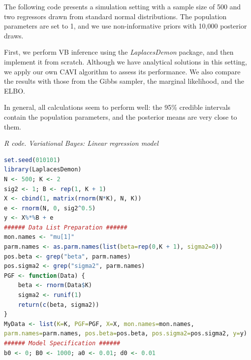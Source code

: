The following code presents a simulation setting with a sample size of 500 and two regressors drawn from standard normal distributions. The population parameters are set to 1, and we use non-informative priors with 10,000 posterior draws.

First, we perform VB inference using the \textit{LaplacesDemon} package, and then implement it from scratch. Although we have analytical solutions in this setting, we apply our own CAVI algorithm to assess its performance. We also compare the results with those from the Gibbs sampler, the marginal likelihood, and the ELBO.

In general, all calculations seem to perform well: the 95\% credible intervals contain the population parameters, and the posterior means are very close to them.
 
\begin{tcolorbox}[enhanced,width=4.67in,center upper,
	fontupper=\large\bfseries,drop shadow southwest,sharp corners]
	\textit{R code. Variational Bayes: Linear regression model}
	\begin{VF}
		\begin{lstlisting}[language=R]
set.seed(010101)
library(LaplacesDemon)
N <- 500; K <- 2
sig2 <- 1; B <- rep(1, K + 1)
X <- cbind(1, matrix(rnorm(N*K), N, K))
e <- rnorm(N, 0, sig2^0.5)
y <- X%*%B + e
###### Data List Preparation ######
mon.names <- "mu[1]"
parm.names <- as.parm.names(list(beta=rep(0,K + 1), sigma2=0))
pos.beta <- grep("beta", parm.names)
pos.sigma2 <- grep("sigma2", parm.names)
PGF <- function(Data) {
	beta <- rnorm(Data$K)
	sigma2 <- runif(1)
	return(c(beta, sigma2))
}
MyData <- list(K=K, PGF=PGF, X=X, mon.names=mon.names,
parm.names=parm.names, pos.beta=pos.beta, pos.sigma2=pos.sigma2, y=y)
###### Model Specification ######
b0 <- 0; B0 <- 1000; a0 <- 0.01; d0 <- 0.01
\end{lstlisting}
	\end{VF}
\end{tcolorbox}

